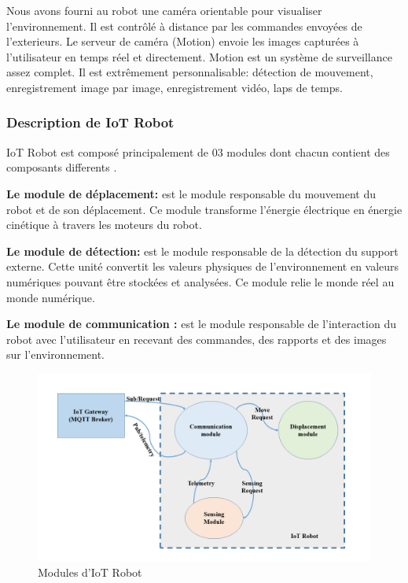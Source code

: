 Nous avons fourni au robot une caméra orientable pour visualiser l'environnement. Il est contrôlé à distance par les commandes envoyées de l'exterieurs. Le serveur de caméra (Motion) envoie les images capturées à l'utilisateur en temps réel et directement. Motion est un système de surveillance assez complet. Il est extrêmement personnalisable: détection de mouvement, enregistrement image par image, enregistrement vidéo, laps de temps.


\subsubsection{Description de IoT Robot}
IoT Robot est composé principalement de 03 modules dont chacun contient des composants differents \cite{zouai2019new}.

\textbf{Le module de déplacement:} est le module responsable du mouvement du robot et de son déplacement. Ce module transforme l'énergie électrique en énergie cinétique à travers les moteurs du robot.

\textbf{Le module de détection:} est le module responsable de la détection du support externe. Cette unité convertit les valeurs physiques de l'environnement en valeurs numériques pouvant être stockées et analysées. Ce module relie le monde réel au monde numérique.


\textbf{Le module de communication :} est le module responsable de l’interaction du robot avec l’utilisateur en recevant des commandes, des rapports et des images sur l’environnement.




\begin{figure}[H]
\centering
\includegraphics[scale=0.35]{chap1/Presentation23.png}
\caption{Modules d'IoT Robot}
\label{fc13}
\end{figure}

